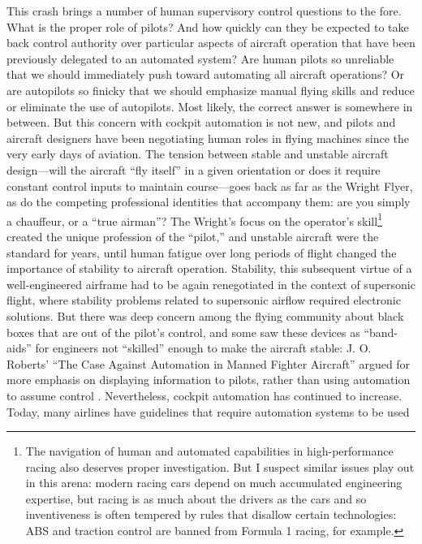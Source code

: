 This crash brings a number of human supervisory control questions to
the fore. What is the proper role of pilots? And how quickly can they
be expected to take back control authority over particular aspects of
aircraft operation that have been previously delegated to an automated
system? Are human pilots so unreliable that we should immediately push
toward automating all aircraft operations? Or are autopilots so
finicky that we should emphasize manual flying skills and reduce or
eliminate the use of autopilots. Most likely, the correct answer is
somewhere in between. But this concern with cockpit automation is not
new, and pilots and aircraft designers have been negotiating human
roles in flying machines since the very early days of aviation. The
tension between stable and unstable aircraft design---will the
aircraft ``fly itself'' in a given orientation or does it require
constant control inputs to maintain course---goes back as far as the
Wright Flyer, as do the competing professional identities that
accompany them: are you simply a chauffeur, or a ``true
airman''\cite[p. 21]{DM}? The Wright's focus on the operator's
skill\footnote{The navigation of human and automated capabilities in
  high-performance racing also deserves proper investigation. But I suspect
similar issues play out in this arena: modern racing cars depend on
much accumulated engineering expertise, but racing is as much about
the drivers as the cars and so inventiveness is often tempered by
rules that disallow certain technologies:  ABS and traction control are
banned from Formula 1 racing, for example.} created the unique profession of the
``pilot,'' and unstable aircraft were the standard for years, until
human fatigue over long periods of flight changed the importance of
stability to aircraft operation\cite[p. 22-24]{DM}. Stability,
this subsequent virtue of a well-engineered airframe had to be again
renegotiated in the context of supersonic flight, where stability
problems related to supersonic airflow required electronic
solutions. But there was deep concern among the
flying community about black boxes that are out of the pilot's
control, and some saw these devices as ``band-aids'' for engineers not
``skilled'' enough to make the aircraft stable:  J.
O. Roberts' ``The Case Against Automation in Manned Fighter Aircraft''
argued for more emphasis on displaying information to pilots, rather
than using automation to assume control \cite[p. 35]{DM}.
Nevertheless, cockpit automation has continued to increase. Today,
many airlines 
have guidelines that require automation systems to be used
